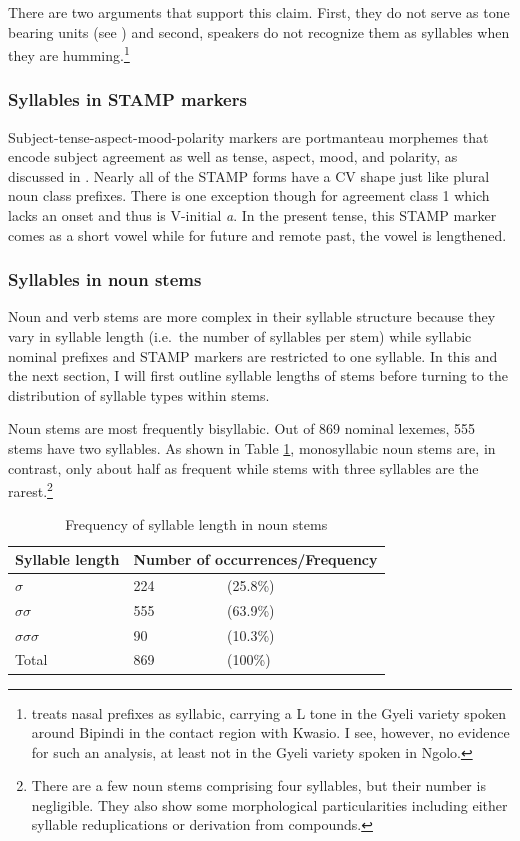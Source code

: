 \noindent There are two arguments that support this claim. First, they do not serve as tone bearing units (see ) and second, speakers do not recognize them as syllables when they are humming.\footnote{\citet[109]{renaud76} treats nasal prefixes as syllabic, carrying a L tone in the Gyeli variety spoken around Bipindi in the contact region with Kwasio. I see, however, no evidence for such an analysis, at least not in the Gyeli variety spoken in Ngolo.}


\subsubsection{Syllables in STAMP markers}
\label{sec:SyllSCOP}

Subject-tense-aspect-mood-polarity markers are portmanteau morphemes that encode subject agreement as well as tense, aspect, mood, and polarity, as discussed in . Nearly all of the STAMP forms  have a CV shape just like plural noun class prefixes. There is one exception though for agreement class 1  which lacks an onset and thus is V-initial {\itshape a}. In the present tense, this STAMP marker comes as a short vowel while for future and remote past, the vowel is lengthened.

\subsubsection{Syllables in noun stems}
\label{sec:SyllN}

Noun and verb stems are more complex in their syllable structure because they vary in syllable length (i.e.\ the number of syllables per stem) while syllabic nominal prefixes and STAMP markers are restricted to one syllable. In this and the next section, I will first outline syllable lengths of stems before turning to the distribution of syllable types within stems.

Noun stems are most frequently bisyllabic. Out of 869 nominal lexemes, 555 stems have two syllables. As shown in Table \ref{Tab:NstemSyll}, monosyllabic noun stems are, in contrast, only about half as frequent while stems with three syllables are the rarest.\footnote{There are a few noun stems comprising four syllables, but their number is negligible. They also show some morphological particularities including either syllable reduplications or derivation from compounds.}


\begin{table} 
\centering
\begin{tabular}{lll}
Syllable length & \multicolumn{2}{l}{Number of occurrences/Frequency} \\  \midrule
$\sigma$    & 224  & (25.8\%) \\      
$\sigma$$\sigma$  & 555 & (63.9\%) \\
$\sigma$$\sigma$$\sigma$  & 90 & (10.3\%) \\
 \midrule
Total & 869 & (100\%)\\
\end{tabular}
\caption{Frequency of syllable length in noun stems}
\label{Tab:NstemSyll}
\end{table}        

